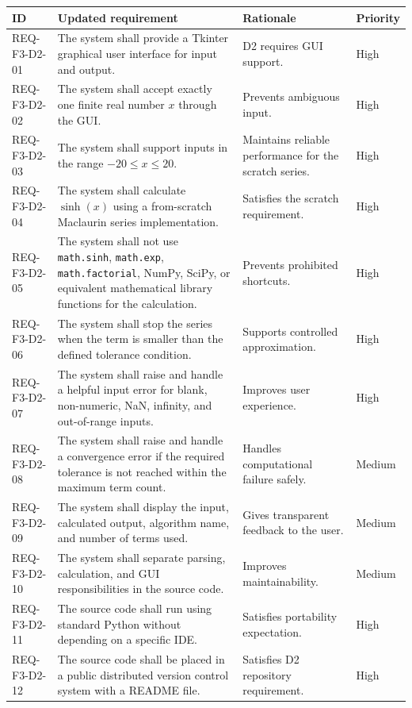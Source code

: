 \documentclass[11pt]{article}
\begin{document}
\begin{longtable}{p{}p{}p{}p{}}
\toprule
\textbf{ID} & \textbf{Updated requirement} & \textbf{Rationale} & \textbf{Priority} \\
\midrule
\endhead
REQ-F3-D2-01 & The system shall provide a Tkinter graphical user interface for input and output. & D2 requires GUI support. & High \\
REQ-F3-D2-02 & The system shall accept exactly one finite real number $x$ through the GUI. & Prevents ambiguous input. & High \\
REQ-F3-D2-03 & The system shall support inputs in the range $-20 \leq x \leq 20$. & Maintains reliable performance for the scratch series. & High \\
REQ-F3-D2-04 & The system shall calculate $\sinh(x)$ using a from-scratch Maclaurin series implementation. & Satisfies the scratch requirement. & High \\
REQ-F3-D2-05 & The system shall not use \texttt{math.sinh}, \texttt{math.exp}, \texttt{math.factorial}, NumPy, SciPy, or equivalent mathematical library functions for the calculation. & Prevents prohibited shortcuts. & High \\
REQ-F3-D2-06 & The system shall stop the series when the term is smaller than the defined tolerance condition. & Supports controlled approximation. & High \\
REQ-F3-D2-07 & The system shall raise and handle a helpful input error for blank, non-numeric, NaN, infinity, and out-of-range inputs. & Improves user experience. & High \\
REQ-F3-D2-08 & The system shall raise and handle a convergence error if the required tolerance is not reached within the maximum term count. & Handles computational failure safely. & Medium \\
REQ-F3-D2-09 & The system shall display the input, calculated output, algorithm name, and number of terms used. & Gives transparent feedback to the user. & Medium \\
REQ-F3-D2-10 & The system shall separate parsing, calculation, and GUI responsibilities in the source code. & Improves maintainability. & Medium \\
REQ-F3-D2-11 & The source code shall run using standard Python without depending on a specific IDE. & Satisfies portability expectation. & High \\
REQ-F3-D2-12 & The source code shall be placed in a public distributed version control system with a README file. & Satisfies D2 repository requirement. & High \\
\bottomrule
\end{longtable}
\end{document}
